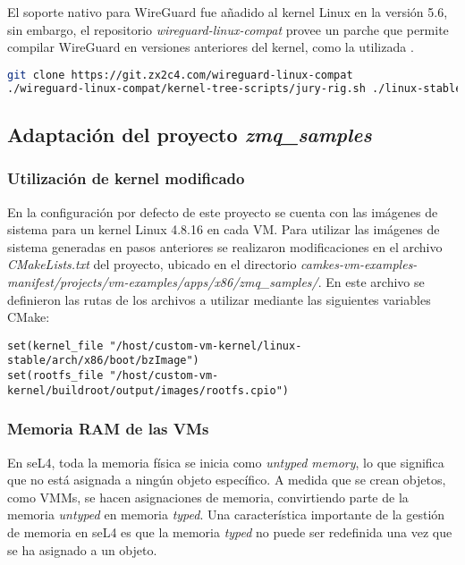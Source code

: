 El soporte nativo para WireGuard fue añadido al kernel Linux en la versión 5.6, sin embargo, el repositorio \textit{wireguard-linux-compat} provee un parche que permite compilar WireGuard en versiones anteriores del kernel, como la utilizada \cite{wireguard-compilation}.

\begin{lstlisting}[language=bash, caption={Parche wireguard-linux-compat para el kernel Linux 4.9.337}, label={lst:wireguard_patch}]
git clone https://git.zx2c4.com/wireguard-linux-compat
./wireguard-linux-compat/kernel-tree-scripts/jury-rig.sh ./linux-stable
\end{lstlisting}


\subsection{Adaptación del proyecto \textit{zmq\_samples}}
\subsubsection{Utilización de kernel modificado}
En la configuración por defecto de este proyecto se cuenta con las imágenes de sistema para un kernel Linux 4.8.16 en cada VM. Para utilizar las imágenes de sistema generadas en pasos anteriores se realizaron modificaciones en el archivo \textit{CMakeLists.txt} del proyecto, ubicado en el directorio \textit{camkes-vm-examples-manifest/projects/vm-examples/apps/x86/zmq\_samples/}. En este archivo se definieron las rutas de los archivos a utilizar mediante las siguientes variables CMake:

\begin{lstlisting}[caption={Variables CMakeLists.txt del proyecto zmq\_samples}, label={lst:zmq_samples_cmake}]
set(kernel_file "/host/custom-vm-kernel/linux-stable/arch/x86/boot/bzImage")
set(rootfs_file "/host/custom-vm-kernel/buildroot/output/images/rootfs.cpio")
\end{lstlisting}

\subsubsection{Memoria RAM de las VMs}
En seL4, toda la memoria física se inicia como \textit{untyped memory}, lo que significa que no está asignada a ningún objeto específico. A medida que se crean objetos, como VMMs, se hacen asignaciones de memoria, convirtiendo parte de la memoria \textit{untyped} en memoria \textit{typed}. Una característica importante de la gestión de memoria en seL4 es que la memoria \textit{typed} no puede ser redefinida una vez que se ha asignado a un objeto. 



